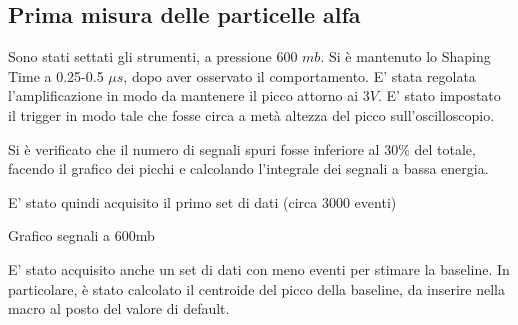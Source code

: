 \subsection{Prima misura delle particelle alfa}
Sono stati settati gli strumenti, a pressione 600 $mb$.
Si è mantenuto lo Shaping Time a 0.25-0.5 $\mu s$, dopo aver osservato il comportamento. %
E' stata regolata l'amplificazione in modo da mantenere il picco attorno ai $3V$.
E' stato impostato il trigger in modo tale che fosse circa a metà altezza del picco sull'oscilloscopio. 


Si è verificato che il numero di segnali spuri fosse inferiore al $30 \%$ del totale, facendo il grafico dei picchi e calcolando l'integrale dei segnali a bassa energia.

E' stato quindi acquisito il primo set di dati (circa 3000 eventi)

\begin{grafico}
 \centering
 \caption{Grafico segnali a 600mb} 
 \label{gr:misura_600} 
\end{grafico}


E' stato acquisito anche un set di dati con meno eventi per stimare la baseline.
In particolare, è stato calcolato il centroide del picco della baseline, da inserire nella macro al posto del valore di default.

